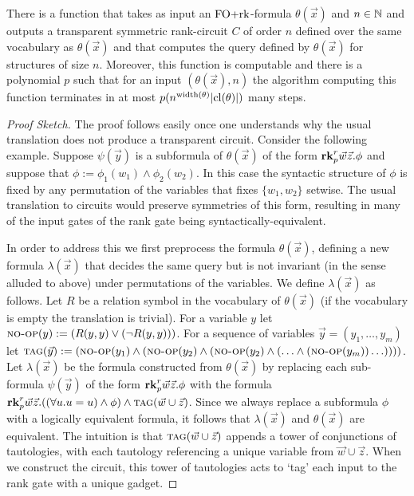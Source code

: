 \documentclass[a4paper,UKenglish]{lipics-v2018}
\begin{document}
\begin{lemma}
  There is a function that takes as input an $\text{\upshape FO+rk}$-formula $\theta(\vec{x})$
  and $n \in \mathbb{N}$ and outputs a transparent symmetric rank-circuit $C$ of
  order $n$ defined over the same vocabulary as $\theta(\vec{x})$ and that
  computes the query defined by $\theta(\vec{x})$ for structures of size $n$.
  Moreover, this function is computable and there is a polynomial $p$ such that
  for an input $(\theta(\vec{x}), n)$ the algorithm computing this function
  terminates in at most $p(n^{\mathrm{width}(\theta)}\vert \mathrm{cl}(\theta) \vert)$ many
  steps.
  \label{lem:translating-FOrk}
  
\end{lemma}
\begin{proof}[Proof Sketch]
  The proof follows easily once one understands why the usual translation does
  not produce a transparent circuit. Consider the following example. Suppose
  $\psi(\vec{y})$ is a subformula of $\theta(\vec{x})$ of the form $\text{\textbf{rk}}^r_p
  \vec{w} \vec{z} . \phi$ and suppose that $\phi := \phi_1(w_1) \land
  \phi_2(w_2)$. In this case the syntactic structure of $\phi$ is fixed by any
  permutation of the variables that fixes $\{w_1, w_2\}$ setwise. The usual
  translation to circuits would preserve symmetries of this form, resulting in
  many of the input gates of the rank gate being syntactically-equivalent.
  
  In order to address this we first preprocess the formula $\theta(\vec{x})$,
  defining a new formula $\lambda (\vec{x})$ that decides the same query but is
  not invariant (in the sense alluded to above) under permutations of the
  variables. We define $\lambda(\vec{x})$ as follows. Let $R$ be a relation
  symbol in the vocabulary of $\theta(\vec{x})$ (if the vocabulary is empty the
  translation is trivial). For a variable $y$ let ${\normalfont\textsc{no-op}}(y) := (R(y, y)
  \lor (\neg R(y, y)))$. For a sequence of variables $\vec{y} = (y_1, \ldots,
  y_m)$ let ${\normalfont\textsc{tag}} (\vec{y}) := ({\normalfont\textsc{no-op}}(y_1) \land ({\normalfont\textsc{no-op}}(y_2) \land
  ( {\normalfont\textsc{no-op}}(y_2) \land ( \ldots \land ({\normalfont\textsc{no-op}}(y_m)) \ldots))))$. Let
  $\lambda (\vec{x})$ be the formula constructed from $\theta(\vec{x})$ by
  replacing each sub-formula $\psi(\vec{y})$ of the form $\text{\textbf{rk}}^r_p \vec{w}
  \vec{z} . \phi$ with the formula $\text{\textbf{rk}}^r_p \vec{w}\vec{z} . ((\forall u . u =
  u) \land \phi) \land {\normalfont\textsc{tag}}(\vec{w} \cup \vec{z})$. Since we always replace
  a subformula $\phi$ with a logically equivalent formula, it follows that
  $\lambda (\vec{x})$ and $\theta (\vec{x})$ are equivalent. The intuition is
  that ${\normalfont\textsc{tag}}(\vec{w} \cup \vec{z})$ appends a tower of conjunctions of
  tautologies, with each tautology referencing a unique variable from $\vec{w}
  \cup \vec{z}$. When we construct the circuit, this tower of tautologies acts
  to `tag' each input to the rank gate with a unique gadget.


\end{proof}
\end{document}
